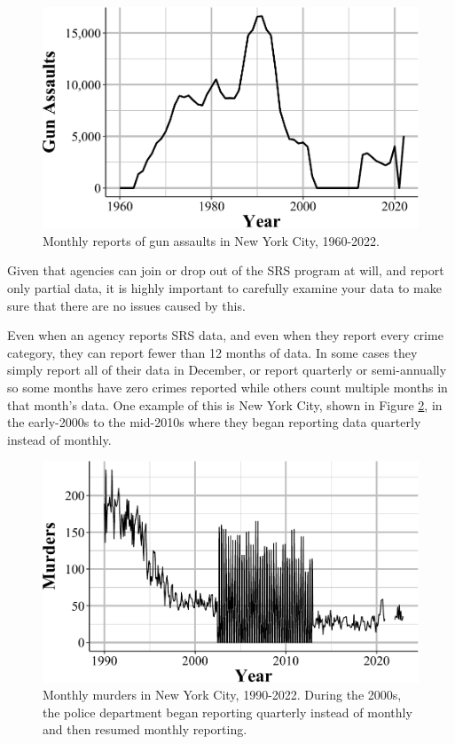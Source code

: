 \documentclass[
  12pt,
  openany]{book}
\begin{document}
\begin{figure}

{\centering \includegraphics[width=0.9\linewidth]{index_files/figure-latex/nycGunAssaults-1} 

}

\caption{Monthly reports of gun assaults in New York City, 1960-2022.}\label{fig:nycGunAssaults}
\end{figure}

Given that agencies can join or drop out of the SRS program at will, and report only partial data, it is highly important to carefully examine your data to make sure that there are no issues caused by this.

Even when an agency reports SRS data, and even when they report every crime category, they can report fewer than 12 months of data. In some cases they simply report all of their data in December, or report quarterly or semi-annually so some months have zero crimes reported while others count multiple months in that month's data. One example of this is New York City, shown in Figure \ref{fig:nycMurderMonthly}, in the early-2000s to the mid-2010s where they began reporting data quarterly instead of monthly.

\begin{figure}

{\centering \includegraphics[width=0.9\linewidth]{index_files/figure-latex/nycMurderMonthly-1} 

}

\caption{Monthly murders in New York City, 1990-2022. During the 2000s, the police department began reporting quarterly instead of monthly and then resumed monthly reporting.}\label{fig:nycMurderMonthly}
\end{figure}
\end{document}
